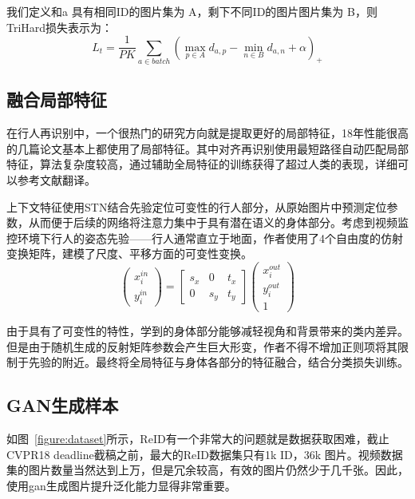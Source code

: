 我们定义和a 具有相同ID的图片集为 A，剩下不同ID的图片图片集为 B，则TriHard损失表示为：
\begin{equation}
	L_t=\frac{1}{PK}\sum_{a \in batch} \left( \max_{p \in A} d_{a,p} -  \min_{n \in B} d_{a,n} +\alpha \right)_+
\end{equation}

\subsection{融合局部特征}

在行人再识别中，一个很热门的研究方向就是提取更好的局部特征\cite{reciprocal,liu2017hydraplus,zhao2017spindle,glad}，18年性能很高的几篇论文基本上都使用了局部特征\cite{liu2017hydraplus,zhao2017spindle}。其中对齐再识别\cite{zhang2017align}使用最短路径自动匹配局部特征，算法复杂度较高，通过辅助全局特征的训练获得了超过人类的表现，详细可以参考文献翻译。

上下文特征\cite{latent}使用STN结合先验定位可变性的行人部分，从原始图片中预测定位参数，从而便于后续的网络将注意力集中于具有潜在语义的身体部分。考虑到视频监控环境下行人的姿态先验——行人通常直立于地面，作者使用了4个自由度的仿射变换矩阵，建模了尺度、平移方面的可变性变换。
\begin{equation}
	\left(\begin{array}{c}
			x^{in}_i \\
			y^{in}_i
		\end{array}\right) =\left[ \begin{array}{ccc}
			s_x & 0   & t_x \\
			0   & s_y & t_y
		\end{array}\right] \left(\begin{array}{c}
			x^{out}_{i} \\
			y^{out}_i   \\
			1
		\end{array}\right)
\end{equation}

由于具有了可变性的特性，学到的身体部分能够减轻视角和背景带来的类内差异。但是由于随机生成的反射矩阵参数会产生巨大形变，作者不得不增加正则项将其限制于先验的附近。最终将全局特征与身体各部分的特征融合，结合分类损失训练。

\subsection{GAN生成样本}

如图~\ref{figure:dataset}所示，ReID有一个非常大的问题就是数据获取困难，截止CVPR18 deadline截稿之前，最大的ReID数据集只有1k ID，36k 图片。视频数据集的图片数量当然达到上万，但是冗余较高，有效的图片仍然少于几千张。因此，使用gan生成图片提升泛化能力显得非常重要。

